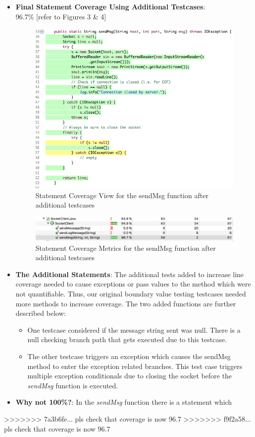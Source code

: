 \documentclass[fontsize=12pt,paper=letter,twoside]{scrartcl}
\begin{document}
\begin{itemize}
\item \textbf{Final Statement Coverage Using Additional Testcases}: \\ 96.7\% [refer to Figures 3 \& 4]
\begin{figure}[!htb]
\begin{center}
\includegraphics[width=.99\textwidth]{images/wbt/bvt/figure3.png}
\end{center}
\caption{Statement Coverage View for the sendMsg function after additional testcases}
\label{fig:wbt_bvt_code}
\end{figure}
\begin{figure}[!htb]
\begin{center}
\includegraphics[width=.99\textwidth]{images/wbt/bvt/figure4.png}
\end{center}
\caption{Statement Coverage Metrics for the sendMsg function after additional testcases}
\label{fig:wbt_bvt_code}
\end{figure}

\item \textbf{The Additional Statements}: The additional tests added to increase line coverage needed to cause exceptions or pass values to the method which were not quantifiable. Thus, our original boundary value testing testcases needed more methods to increase coverage. The two added functions are further described below:
\begin{itemize}
\item One testcase considered if the message string sent was null. There is a null checking branch path that gets executed due to this testcase.
\item The other testcase triggers an exception which causes the sendMsg method to enter the exception related branches. This test case triggers multiple exception conditionals due to closing the socket before the \emph{sendMsg} function is executed.
\end{itemize}
\item \textbf{Why not 100\%?}: In the \emph{sendMsg} function there is a statement which 
\end{itemize}
>>>>>>> 7a3b6fe... pls check that coverage is now 96.7%
>>>>>>> f9f2a58... pls check that coverage is now 96.7%
\end{document}
